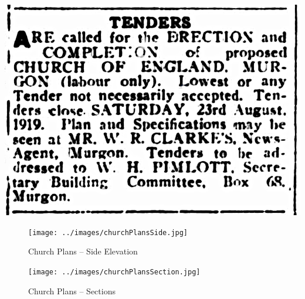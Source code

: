 \medskip
\begin{minipage}[b]{\linewidth}
\begin{center}
\includegraphics[width=1.\linewidth,center]{../images/tenderAdvertisement.png}
\end{center}
\end{minipage}
\medskip










\begin{figure}
\begin{center}
\texttt{[image: ../images/churchPlansSide.jpg]}
\caption{Church Plans -- Side Elevation}
\end{center}
\end{figure}










\begin{figure}
\begin{center}
\texttt{[image: ../images/churchPlansSection.jpg]}
\caption{Church Plans -- Sections}
\end{center}
\end{figure}




